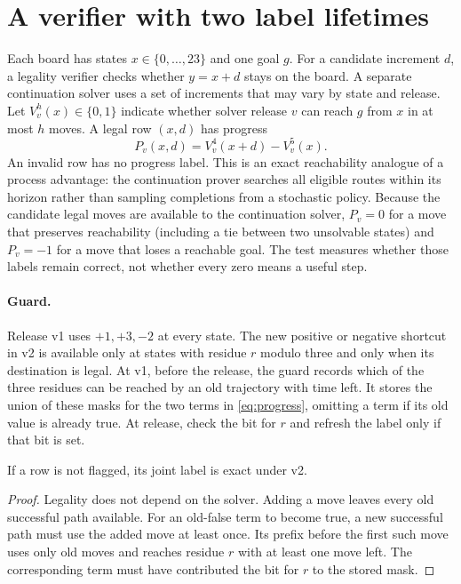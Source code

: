 \section{A verifier with two label lifetimes}

Each board has states $x\in\{0,\ldots,23\}$ and one goal $g$.
For a candidate increment $d$, a legality verifier checks whether $y=x+d$
stays on the board. A separate continuation solver uses a set of increments
that may vary by state and release. Let $V_v^h(x)\in\{0,1\}$ indicate
whether solver release $v$ can reach $g$ from $x$ in at most $h$ moves.
A legal row $(x,d)$ has progress
\begin{equation}
  P_v(x,d) = V_v^4(x+d)-V_v^5(x).
  \label{eq:progress}
\end{equation}
An invalid row has no progress label. This is an exact reachability
analogue of a process advantage: the continuation prover searches
all eligible routes within its horizon rather than sampling completions
from a stochastic policy. Because the candidate legal moves are available
to the continuation solver, $P_v=0$ for a move that preserves reachability
(including a tie between two unsolvable states) and $P_v=-1$ for a move
that loses a reachable goal. The test measures whether those labels
remain correct, not whether every zero means a useful step.

\paragraph{Guard.}
Release v1 uses $+1,+3,-2$ at every state. The new positive or negative
shortcut in v2 is available only at states with residue $r$ modulo three
and only when its destination is legal. At v1, before the release,
the guard records which of the three residues can be reached by an old
trajectory with time left. It stores the union of these masks for the
two terms in \cref{eq:progress}, omitting a term if its old value is
already true. At release, check the bit for $r$ and refresh the label
only if that bit is set.

\begin{proposition}
If a row is not flagged, its joint label is exact under v2.
\end{proposition}
\begin{proof}
Legality does not depend on the solver. Adding a move leaves every old
successful path available. For an old-false term to become true, a new
successful path must use the added move at least once. Its prefix
before the first such move uses only old moves and reaches residue $r$
with at least one move left. The corresponding term must have
contributed the bit for $r$ to the stored mask.
\end{proof}

